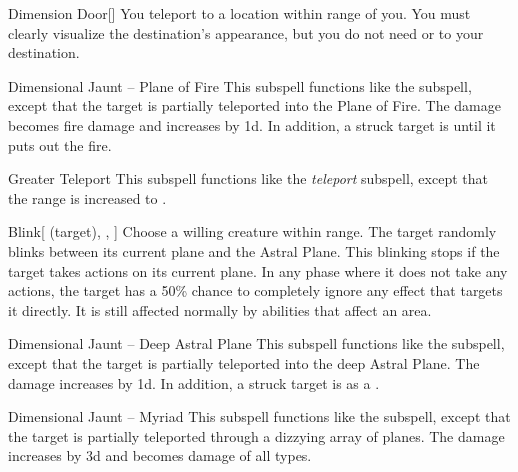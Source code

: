 \begin{ability}[\nth{3}]{Dimension Door}[]
You teleport to a location within \rngext range of you.
You must clearly visualize the destination's appearance, but you do not need  or  to your destination.
\end{ability}
\vspace{0.25em}


\begin{ability}[\nth{3}]{Dimensional Jaunt -- Plane of Fire}
This subspell functions like the  subspell, except that the target is partially teleported into the Plane of Fire.
The damage becomes fire damage and increases by \plus1d.
In addition, a struck target is  until it puts out the fire.
\end{ability}
\vspace{0.25em}


\begin{ability}[\nth{3}]{Greater Teleport}
This subspell functions like the \textit{teleport} subspell, except that the range is increased to \rngext.
\end{ability}
\vspace{0.25em}


\begin{ability}[\nth{4}]{Blink}[ (target), , ]
Choose a willing creature within \rngclose range.
The target randomly blinks between its current plane and the Astral Plane.
This blinking stops if the target takes actions on its current plane.
In any phase where it does not take any actions, the target has a 50\% chance to completely ignore any effect that targets it directly.
It is still affected normally by abilities that affect an area.
\end{ability}
\vspace{0.25em}


\begin{ability}[\nth{5}]{Dimensional Jaunt -- Deep Astral Plane}
This subspell functions like the  subspell, except that the target is partially teleported into the deep Astral Plane.
The damage increases by \plus1d.
In addition, a struck target is  as a .
\end{ability}
\vspace{0.25em}


\begin{ability}[\nth{7}]{Dimensional Jaunt -- Myriad}
This subspell functions like the  subspell, except that the target is partially teleported through a dizzying array of planes.
The damage increases by \plus3d and becomes damage of all types.
\end{ability}
\vspace{0.25em}


